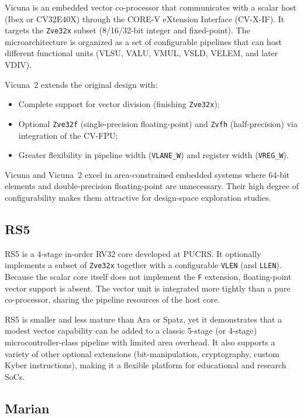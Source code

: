\documentclass[11pt,a4paper]{article}
\begin{document}
Vicuna is an embedded vector co-processor that communicates with a scalar host (Ibex or CV32E40X) through the CORE-V eXtension Interface (CV-X-IF). It targets the \texttt{Zve32x} subset (8/16/32-bit integer and fixed-point). The microarchitecture is organized as a set of configurable pipelines that can host different functional units (VLSU, VALU, VMUL, VSLD, VELEM, and later VDIV).

Vicuna~2 extends the original design with:

\begin{itemize}
  \item Complete support for vector division (finishing \texttt{Zve32x});
  \item Optional \texttt{Zve32f} (single-precision floating-point) and \texttt{Zvfh} (half-precision) via integration of the CV-FPU;
  \item Greater flexibility in pipeline width (\texttt{VLANE\_W}) and register width (\texttt{VREG\_W}).
\end{itemize}

Vicuna and Vicuna~2 excel in area-constrained embedded systems where 64-bit elements and double-precision floating-point are unnecessary. Their high degree of configurability makes them attractive for design-space exploration studies.

\subsection{RS5}

RS5 is a 4-stage in-order RV32 core developed at PUCRS. It optionally implements a subset of \texttt{Zve32x} together with a configurable \texttt{VLEN} (and \texttt{LLEN}). Because the scalar core itself does not implement the \texttt{F} extension, floating-point vector support is absent. The vector unit is integrated more tightly than a pure co-processor, sharing the pipeline resources of the host core.

RS5 is smaller and less mature than Ara or Spatz, yet it demonstrates that a modest vector capability can be added to a classic 5-stage (or 4-stage) microcontroller-class pipeline with limited area overhead. It also supports a variety of other optional extensions (bit-manipulation, cryptography, custom Kyber instructions), making it a flexible platform for educational and research SoCs.

\subsection{Marian}
\end{document}
